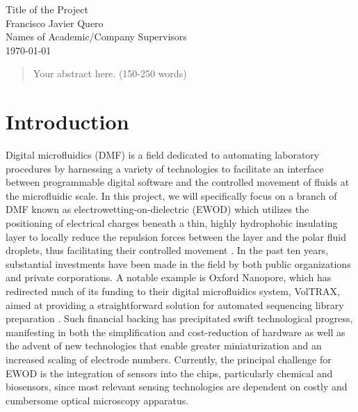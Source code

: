 \documentclass[12pt]{article}
\begin{document}
\begin{titlepage}
    \centering
    \vspace*{60px}
    \huge{Title of the Project}\\
    \vspace{10px}
    \large{Francisco Javier Quero}\\
    \large{Names of Academic/Company Supervisors}\\
    \vfill
    \today
    \vfill
\end{titlepage}

\newpage
\begin{abstract}
\noindent
Your abstract here. (150-250 words)
\end{abstract}

\newpage
\section*{Introduction}

Digital microfluidics (DMF) is a field dedicated to automating laboratory procedures by harnessing a variety of technologies to facilitate an interface between programmable digital software and the controlled movement of fluids at the microfluidic scale.  In this project, we will specifically focus on a branch of DMF known as electrowetting-on-dielectric (EWOD) which utilizes the positioning of electrical charges beneath a thin, highly hydrophobic insulating layer to locally reduce the repulsion forces between the layer and the polar fluid droplets, thus facilitating their controlled movement \cite{beniContinuousElectrowettingEffect1982}. In the past ten years, substantial investments have been made in the field by both public organizations and private corporations. A notable example is Oxford Nanopore, which has redirected much of its funding to their digital microfluidics system, VolTRAX, aimed at providing a straightforward solution for automated sequencing library preparation \cite{VolTRAX2018,OxfordNanoporeAnnounces}. Such financial backing has precipitated swift technological progress, manifesting in both the simplification and cost-reduction of hardware \cite{zhang2DLargescaleEWOD2020} as well as the advent of new technologies that enable greater miniaturization and an increased scaling of electrode numbers\cite{qinSolutionMassProduction2021}. Currently, the principal challenge for EWOD is the integration of sensors into the chips, particularly chemical and biosensors, since most relevant sensing technologies are dependent on costly and cumbersome optical microscopy apparatus.
\end{document}
